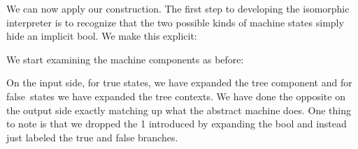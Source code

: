 \documentclass{llncs}
\begin{document}
\begin{center}
\end{center}

We can now apply our construction. The first step to developing the
isomorphic interpreter is to recognize that the two possible kinds of machine
states simply hide an implicit {{bool}}. We make this explicit:

\begin{small}
\begin{multicols}{2}
%

\end{multicols}
\end{small}

We start examining the machine components as before:

\begin{center}
\end{center}

On the input side, for {{true}} states, we have expanded the tree component
and for {{false}}~states we have expanded the tree contexts. We have done the
opposite on the output side exactly matching up what the abstract machine
does. One thing to note is that we dropped the {{1}} introduced by expanding
the {{bool}} and instead just labeled the {{true}} and {{false}} branches.
\end{document}
